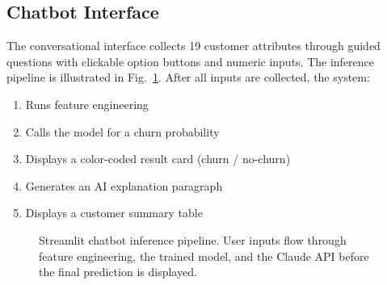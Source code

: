 \documentclass[conference]{IEEEtran}
\begin{document}
\subsection{Chatbot Interface}

The conversational interface collects 19 customer attributes through guided questions with clickable option buttons and numeric inputs. The inference pipeline is illustrated in Fig.~\ref{fig:deploy}. After all inputs are collected, the system:
\begin{enumerate}
    \item Runs feature engineering
    \item Calls the model for a churn probability
    \item Displays a color-coded result card (churn / no-churn)
    \item Generates an AI explanation paragraph
    \item Displays a customer summary table
\end{enumerate}

\begin{figure}[t]
\centering
{}
\caption{Streamlit chatbot inference pipeline. User inputs flow through feature engineering, the trained model, and the Claude API before the final prediction is displayed.}
\label{fig:deploy}
\end{figure}
\end{document}
